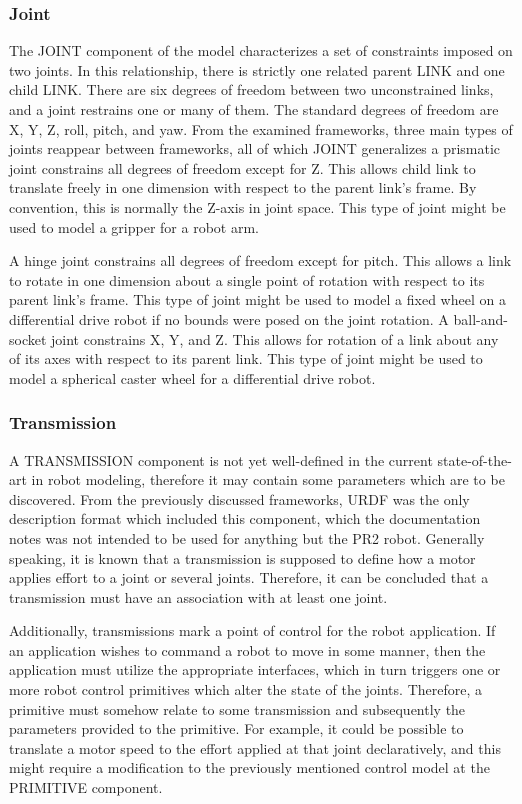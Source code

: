 \subsubsection{Joint} 
The JOINT component of the model characterizes a set of constraints imposed on two joints. In this relationship, there is strictly one related parent LINK and one child LINK. There are six degrees of freedom between two unconstrained links, and a joint restrains one or many of them. The standard degrees of freedom are X, Y, Z, roll, pitch, and yaw. From the examined frameworks, three main types of joints reappear between frameworks, all of which JOINT generalizes a prismatic joint constrains all degrees of freedom except for Z. This allows child link to translate freely in one dimension with respect to the parent link's frame. By convention, this is normally the Z-axis in joint space. This type of joint might be used to model a gripper for a robot arm.

A hinge joint constrains all degrees of freedom except for pitch. This allows a link to rotate in one dimension about a single point of rotation with respect to its parent link's frame. This type of joint might be used to model a fixed wheel on a differential drive robot if no bounds were posed on the joint rotation.  A ball-and-socket joint constrains X, Y, and Z. This allows for rotation of a link about any of its axes with respect to its parent link. This type of joint might be used to model a spherical caster wheel for a differential drive robot.

\subsubsection{Transmission}
A TRANSMISSION component is not yet well-defined in the current state-of-the-art in robot modeling, therefore it may contain some parameters which are to be discovered. From the previously discussed frameworks, URDF was the only description format which included this component, which the documentation notes was not intended to be used for anything but the PR2 robot. Generally speaking, it is known that a transmission is supposed to define how a motor applies effort to a joint or several joints. Therefore, it can be concluded that a transmission must have an association with at least one joint.

Additionally, transmissions mark a point of control for the robot application. If an application wishes to command a robot to move in some manner, then the application must utilize the appropriate interfaces, which in turn triggers one or more robot control primitives which alter the state of the joints. Therefore, a primitive must somehow relate to some transmission and subsequently the parameters provided to the primitive. For example, it could be possible to translate a motor speed to the effort applied at that joint declaratively, and this might require a modification to the previously mentioned control model at the PRIMITIVE component. 

